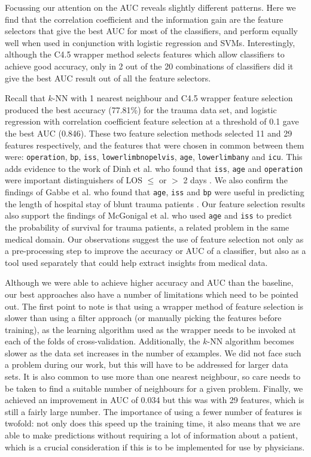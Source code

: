 \documentclass{article}
\begin{document}
Focussing our attention on the AUC reveals slightly different patterns. Here we
find that the correlation coefficient and the information gain are the feature
selectors that give the best AUC for most of the classifiers, and perform
equally well when used in conjunction with logistic regression and SVMs.
Interestingly, although the C4.5
wrapper method selects features which allow classifiers to achieve good
accuracy, only in 2 out of the 20 combinations of classifiers did it give the
best AUC result out of all the feature selectors. 

Recall that $k$-NN with 1 nearest neighbour and C4.5 wrapper feature
selection produced the best accuracy (77.81\%) for the trauma data set, and
logistic regression with correlation coefficient feature selection at a
threshold of 0.1 gave the best AUC (0.846). These two feature selection
methods selected 11 and 29 features respectively, and the features that
were chosen in common between them were: \texttt{operation}, \texttt{bp},
\texttt{iss}, \texttt{lowerlimbnopelvis}, \texttt{age}, \texttt{lowerlimbany}
and \texttt{icu}. This adds evidence to the work of Dinh et al. who found
that \texttt{iss}, \texttt{age} and \texttt{operation} were important
distinguishers of LOS $\leq$ or $>$ 2 days \cite{Dinh2013a}. We also
confirm the findings of Gabbe et al. who found that \texttt{age},
\texttt{iss} and \texttt{bp} were useful in predicting the length of
hospital stay of blunt trauma patients \cite{Gabbe2005}. Our feature
selection results also
support the findings of McGonigal et al. \cite{McGonigal1993} who used
\texttt{age} and
\texttt{iss} to predict the probability of survival for trauma patients, a
related problem in the same medical domain.
Our observations suggest the use of feature selection not only as a
pre-processing step to improve the accuracy or AUC of a classifier, but also
as a tool used separately that could help extract insights from medical data.

Although we were able to achieve higher accuracy and AUC than the baseline,
our best approaches also have a number of limitations which need to be pointed
out. The first point to note is that using a wrapper method of feature
selection is slower than using a filter approach (or manually picking the
features before training), as the learning algorithm used as the wrapper
needs to be invoked at each of the folds of cross-validation. Additionally,
the $k$-NN algorithm becomes slower as the data set increases in the number
of examples. We did not face such a problem during our work, but this will
have to be addressed for larger data sets. It is also common to use more
than one nearest neighbour, so care needs to be taken to find a suitable number
of neighbours for a given problem. Finally, we achieved an improvement
in AUC of 0.034 but this was with 29 features, which is still a fairly large
number. The importance of using a fewer number of features is twofold: not
only does this speed up the training time, it also means that we are able to
make predictions without requiring a lot of information about a patient,
which is a crucial consideration if this is to be implemented for use by
physicians.
\end{document}
